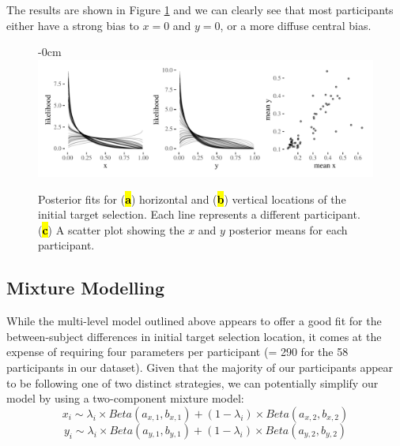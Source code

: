 \documentclass[vision,article,accept,pdftex,moreauthors]{Definitions/mdpi}
\begin{document}
The results are shown in Figure \ref{fig:qjep_init_sel_mdl} and we can clearly see that most participants either have a strong bias to $x=0$ and $y=0$, or a more diffuse central bias. 
\vspace{-6pt}
\begin{figure}[H]
\begin{adjustwidth}{-\extralength}{0cm}
\centering
\includegraphics[width=17.5 cm]{Figures/init_sel_mdl.pdf}
\end{adjustwidth}
\caption{Posterior fits for ({\textbf{\hl{a}}}) horizontal and ({\textbf{\hl{b}}}) vertical locations of the initial target selection. Each line represents a different participant. ({\textbf{\hl{c}}}) A scatter plot showing the $x$ and $y$ posterior means for each participant.}%

\label{fig:qjep_init_sel_mdl}
\end{figure} 

\subsection{Mixture Modelling}

While the multi-level model outlined above appears to offer a good fit for the between-subject differences in initial target selection location, it comes at the expense of requiring four parameters per participant (= 290 for the 58 participants in our dataset). Given that the majority of our participants appear to be following one of two distinct strategies, we can potentially simplify our model by using a two-component mixture model:
\clearpage
\begin{equation}
    x_i \sim \lambda_i \times Beta(a_{x,1}, b_{x,1}) + (1-\lambda_i) \times Beta(a_{x,2}, b_{x,2})
    \label{eq:beta2x}
\end{equation}
\begin{equation}
    y_i \sim \lambda_i \times Beta(a_{y,1}, b_{y,1}) + (1-\lambda_i) \times Beta(a_{y,2}, b_{y,2})
    \label{eq:beta2y}
\end{equation}
\end{document}
